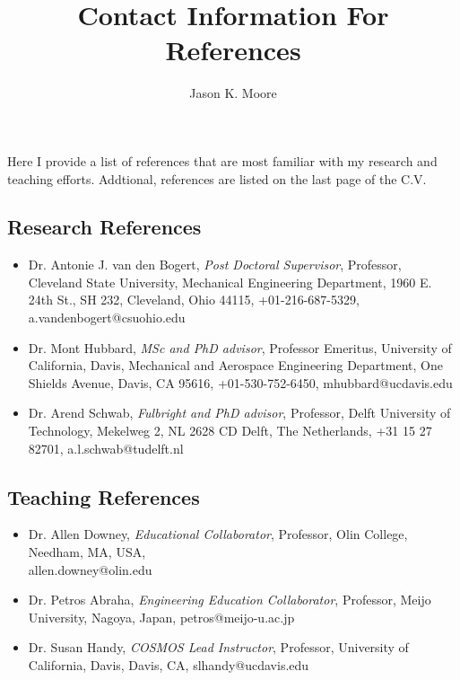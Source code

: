 \documentclass{article}
\title{Contact Information For References}
\author{Jason K. Moore}
\date{}
\begin{document}
\maketitle

Here I provide a list of references that are most familiar with my research and
teaching efforts. Addtional, references are listed on the last page of the C.V.

\subsection*{Research References}

\begin{itemize}
  \item Dr. Antonie J. van den Bogert,
    \emph{Post Doctoral Supervisor},
    Professor,
    Cleveland State University,
    Mechanical Engineering Department,
    1960 E. 24th St., SH 232,
    Cleveland, Ohio 44115,
    +01-216-687-5329,
    a.vandenbogert@csuohio.edu
  \item Dr. Mont Hubbard,
    \emph{MSc and PhD advisor},
    Professor Emeritus,
    University of California, Davis,
    Mechanical and Aerospace Engineering Department,
    One Shields Avenue, Davis, CA 95616,
    +01-530-752-6450,
    mhubbard@ucdavis.edu
  \item Dr. Arend Schwab,
    \emph{Fulbright and PhD advisor},
    Professor,
    Delft University of Technology,
    Mekelweg 2, NL 2628 CD Delft, The Netherlands,
    +31 15 27 82701,
    a.l.schwab@tudelft.nl
\end{itemize}

\subsection*{Teaching References}

\begin{itemize}
  \item Dr. Allen Downey,
    \emph{Educational Collaborator},
    Professor,
    Olin College,
    Needham, MA, USA,
    \\ allen.downey@olin.edu
  \item Dr. Petros Abraha,
    \emph{Engineering Education Collaborator},
    Professor,
    Meijo University,
    Nagoya, Japan,
    petros@meijo-u.ac.jp
  \item Dr. Susan Handy,
    \emph{COSMOS Lead Instructor},
    Professor,
    University of California, Davis,
    Davis, CA,
    slhandy@ucdavis.edu
\end{itemize}
\end{document}
